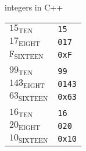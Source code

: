 \begin{frame}[fragile,label=numCpp]{integers in C++}
\begin{tabular}{l|l}
$15_\text{TEN}$ & \texttt{15} \\
$17_\text{EIGHT}$ & \texttt{017} \\
$\mathtt{F}_\text{SIXTEEN}$ & \texttt{0xF} \\
    \multicolumn{2}{l}{} \\
$99_\text{TEN}$ & \texttt{99} \\
$143_\text{EIGHT}$ & \texttt{0143} \\
$63_\text{SIXTEEN}$ & \texttt{0x63} \\

    \multicolumn{2}{l}{} \\
$16_\text{TEN}$ & \texttt{16} \\
$20_\text{EIGHT}$ & \texttt{020} \\
$10_\text{SIXTEEN}$ & \texttt{0x10} \\
\end{tabular}
\end{frame}
